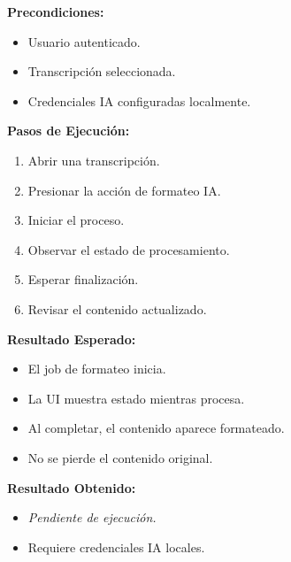 \documentclass[12pt, a4paper]{article}
\newcommand{\prioChip}[2]{%
  \colorbox{#1}{\textcolor{white}{\footnotesize\textbf{#2}}}%
}
\newcommand{\statusChip}[2]{%
  \colorbox{#1}{\textcolor{white}{\footnotesize\textbf{#2}}}%
}
\begin{document}
\vspace{0.3cm}

\begin{tcolorbox}[enhanced, breakable, colback=white, colframe=espe-blue,
  boxrule=1pt, arc=5pt,
  title={\textbf{CP-09} \enspace Formateo IA de una transcripci\'on \hfill \prioChip{media}{Media} \enspace \statusChip{pendiente-orange}{PENDIENTE}},
  fonttitle=\color{white},
  attach boxed title to top left={yshift=-2mm,xshift=4mm},
  boxed title style={colback=espe-blue,arc=3pt}]
\begin{minipage}[t]{0.48\linewidth}
\textbf{Precondiciones:}
\begin{itemize}[noitemsep,topsep=2pt]
  \item Usuario autenticado.
  \item Transcripci\'on seleccionada.
  \item Credenciales IA configuradas localmente.
\end{itemize}
\textbf{Pasos de Ejecuci\'on:}
\begin{enumerate}[noitemsep,topsep=2pt]
  \item Abrir una transcripci\'on.
  \item Presionar la acci\'on de formateo IA.
  \item Iniciar el proceso.
  \item Observar el estado de procesamiento.
  \item Esperar finalizaci\'on.
  \item Revisar el contenido actualizado.
\end{enumerate}
\end{minipage}\hfill
\begin{minipage}[t]{0.48\linewidth}
\textbf{Resultado Esperado:}
\begin{itemize}[noitemsep,topsep=2pt]
  \item El job de formateo inicia.
  \item La UI muestra estado mientras procesa.
  \item Al completar, el contenido aparece formateado.
  \item No se pierde el contenido original.
\end{itemize}
\vspace{4pt}
\textbf{Resultado Obtenido:}
\begin{itemize}[noitemsep,topsep=2pt]
  \item \textit{Pendiente de ejecuci\'on.}
  \item Requiere credenciales IA locales.
\end{itemize}
\end{minipage}
\end{tcolorbox}
\end{document}
